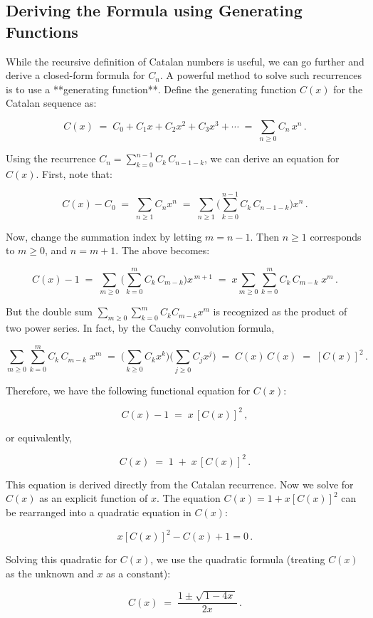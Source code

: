 \documentclass{article}
\begin{document}
\subsection{Deriving the Formula using Generating Functions}

While the recursive definition of Catalan numbers is useful, we can go further and derive a closed-form formula for $C_n$. A powerful method to solve such recurrences is to use a **generating function**. Define the generating function $C(x)$ for the Catalan sequence as:

\[
C(x) \;=\; C_0 + C_1 x + C_2 x^2 + C_3 x^3 + \cdots \;=\; \sum_{n\ge 0} C_n \, x^n\,.
\]

Using the recurrence $C_n = \sum_{k=0}^{n-1} C_k\,C_{n-1-k}$, we can derive an equation for $C(x)$. First, note that:

\[
C(x) - C_0 \;=\; \sum_{n\ge 1} C_n x^n \;=\; \sum_{n\ge 1}\Big(\sum_{k=0}^{n-1} C_k\,C_{n-1-k}\Big) x^n\,.
\]

Now, change the summation index by letting $m = n-1$. Then $n\ge 1$ corresponds to $m \ge 0$, and $n = m+1$. The above becomes:

\[
C(x) - 1 \;=\; \sum_{m\ge 0} \Big(\sum_{k=0}^{m} C_k\,C_{m-k}\Big) x^{\,m+1} \;=\; x \sum_{m\ge 0} \sum_{k=0}^{m} C_k\,C_{m-k}\; x^m\,.
\]

But the double sum $\sum_{m\ge 0}\sum_{k=0}^{m} C_k C_{m-k} x^m$ is recognized as the product of two power series. In fact, by the Cauchy convolution formula, 

\[
\sum_{m\ge 0}\sum_{k=0}^{m} C_k\,C_{m-k}\; x^m \;=\; \Big(\sum_{k\ge 0} C_k x^k\Big)\Big(\sum_{j\ge 0} C_j x^j\Big) \;=\; C(x)\,C(x) \;=\; [C(x)]^2\,.
\]

Therefore, we have the following functional equation for $C(x)$:

\[
C(x) - 1 \;=\; x\,[C(x)]^2\,,
\] 

or equivalently,

\[
C(x) \;=\; 1 \;+\; x\,[C(x)]^2\,.
\]

This equation is derived directly from the Catalan recurrence. Now we solve for $C(x)$ as an explicit function of $x$. The equation $C(x) = 1 + x[C(x)]^2$ can be rearranged into a quadratic equation in $C(x)$:

\[
x [C(x)]^2 - C(x) + 1 = 0\,.
\]

Solving this quadratic for $C(x)$, we use the quadratic formula (treating $C(x)$ as the unknown and $x$ as a constant):

\[
C(x) \;=\; \frac{1 \pm \sqrt{\,1 - 4x\,}}{2x}\,. 
\]
\end{document}
